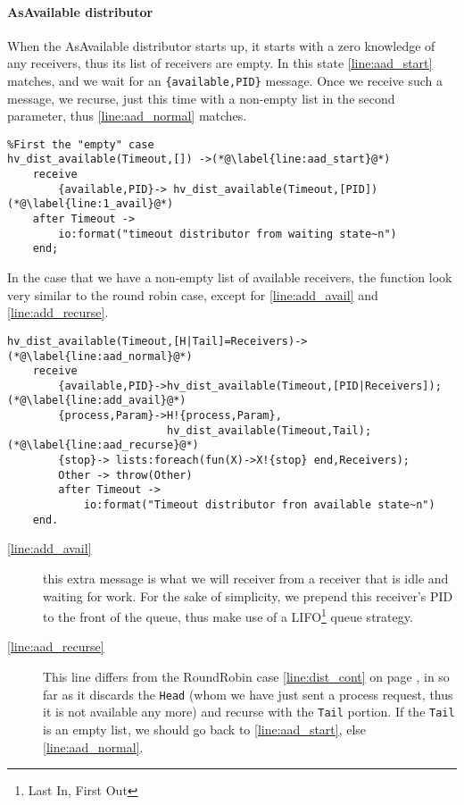 \paragraph{AsAvailable distributor}

When the AsAvailable distributor starts up, it starts with a zero
knowledge of any receivers, thus its list of receivers are empty. In
this state \autoref{line:aad_start} matches, and we wait for an
\texttt{\{available,PID\}} message. Once we receive such a message, we
recurse, just this time with a non-empty list in the second parameter,
thus \autoref{line:aad_normal} matches.

\begin{lstlisting}[name=hvp2]
%The Available distributor
%First the "empty" case
hv_dist_available(Timeout,[]) ->(*@\label{line:aad_start}@*)
	receive
		{available,PID}-> hv_dist_available(Timeout,[PID])(*@\label{line:1_avail}@*)
	after Timeout -> 
		io:format("timeout distributor from waiting state~n")
	end;
\end{lstlisting}

In the case that we have a non-empty list of available receivers, the
function look very similar to the round robin case, except for
\autoref{line:add_avail} and \autoref{line:add_recurse}.

\begin{lstlisting}[name=hvp2]
%Receiver list not empty, "normal" case:
hv_dist_available(Timeout,[H|Tail]=Receivers)-> (*@\label{line:aad_normal}@*)
	receive
		{available,PID}->hv_dist_available(Timeout,[PID|Receivers]);(*@\label{line:add_avail}@*)
		{process,Param}->H!{process,Param},
						 hv_dist_available(Timeout,Tail);(*@\label{line:aad_recurse}@*)
		{stop}-> lists:foreach(fun(X)->X!{stop} end,Receivers);
		Other -> throw(Other)
		after Timeout ->
			io:format("Timeout distributor fron available state~n")
	end.
\end{lstlisting}

\begin{description}
\item[\autoref{line:add_avail}] this extra message is what we will
  receiver from a receiver that is idle and waiting for work. For the sake
  of simplicity, we prepend this receiver's PID to the front of the
  queue, thus make use of a LIFO\footnote{Last In, First Out} queue strategy.
\item[\autoref{line:aad_recurse}] This line differs from the
  RoundRobin case \ref{line:dist_cont} on page
  \pageref{line:dist_cont}, in so far as it discards the \texttt{Head}
  (whom we have just sent a process request, thus it is not available
  any more) and recurse with the \texttt{Tail} portion. If the
  \texttt{Tail} is an empty list, we should go back to
  \autoref{line:aad_start}, else \autoref{line:aad_normal}.
\end{description}

